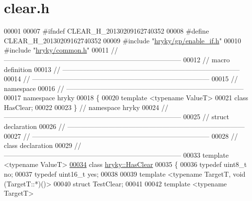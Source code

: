 \hypertarget{clear_8h_source}{\section{clear.\-h}
}

\begin{DoxyCode}
00001 
00007 \textcolor{preprocessor}{#ifndef CLEAR\_H\_20130209162740352}
00008 \textcolor{preprocessor}{}\textcolor{preprocessor}{#define CLEAR\_H\_20130209162740352}
00009 \textcolor{preprocessor}{}\textcolor{preprocessor}{#include "\hyperlink{enable__if_8h}{hryky/gp/enable_if.h}"}
00010 \textcolor{preprocessor}{#include "\hyperlink{common_8h}{hryky/common.h}"}
00011 \textcolor{comment}{//
      ------------------------------------------------------------------------------}
00012 \textcolor{comment}{// macro definition}
00013 \textcolor{comment}{//
      ------------------------------------------------------------------------------}
00014 \textcolor{comment}{//
      ------------------------------------------------------------------------------}
00015 \textcolor{comment}{// namespace}
00016 \textcolor{comment}{//
      ------------------------------------------------------------------------------}
00017 \textcolor{keyword}{namespace }hryky
00018 \{
00020     \textcolor{keyword}{template} <\textcolor{keyword}{typename} ValueT>
00021     \textcolor{keyword}{class }HasClear;
00022 
00023 \} \textcolor{comment}{// namespace hryky}
00024 \textcolor{comment}{//
      ------------------------------------------------------------------------------}
00025 \textcolor{comment}{// struct declaration}
00026 \textcolor{comment}{//
      ------------------------------------------------------------------------------}
00027 \textcolor{comment}{//
      ------------------------------------------------------------------------------}
00028 \textcolor{comment}{// class declaration}
00029 \textcolor{comment}{//
      ------------------------------------------------------------------------------}
00033 \textcolor{comment}{}\textcolor{keyword}{template} <\textcolor{keyword}{typename} ValueT>
\hypertarget{clear_8h_source_l00034}{}\hyperlink{classhryky_1_1_has_clear}{00034} \textcolor{keyword}{class }\hyperlink{classhryky_1_1_has_clear}{hryky::HasClear}
00035 \{
00036     \textcolor{keyword}{typedef} uint8\_t no;
00037     \textcolor{keyword}{typedef} uint16\_t yes;
00038 
00039     \textcolor{keyword}{template} <\textcolor{keyword}{typename} TargetT, \textcolor{keywordtype}{void} (TargetT::*)()>
00040     \textcolor{keyword}{struct }TestClear;
00041 
00042     \textcolor{keyword}{template} <\textcolor{keyword}{typename} TargetT>

\end{DoxyCode}
